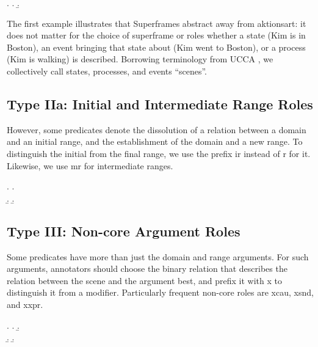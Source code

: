 \documentclass[a4paper]{article}
\begin{document}
\ex. \a. 
     \b. 

The first example illustrates that Superframes abstract away from aktionsart: it does not matter for the choice of superframe or roles whether a state (Kim is in Boston), an event bringing that state about (Kim went to Boston), or a process (Kim is walking) is described. Borrowing terminology from UCCA \citep{abend-rappoport-2013-universal}, we collectively call states, processes, and events ``scenes''.


\subsection{Type IIa: Initial and Intermediate Range Roles}

However, some predicates denote the dissolution of a relation between a domain and an initial range, and the establishment of the domain and a new range. To distinguish the initial from the final range, we use the prefix \textsf{ir} instead of \textsf{r} for it. Likewise, we use \textsf{mr} for intermediate ranges.

\ex. \a. \\
     \b. 
     \b. 


\subsection{Type III: Non-core Argument Roles}

Some predicates have more than just the domain and range arguments. For such arguments, annotators should choose the binary relation that describes the relation between the scene and the argument best, and prefix it with \textsf{x} to distinguish it from a modifier. Particularly frequent non-core roles are \textsf{xcau}, \textsf{xsnd}, and \textsf{xxpr}.

\ex. \a. 
     \b. \\
     \b. 
     \b. 
\end{document}
